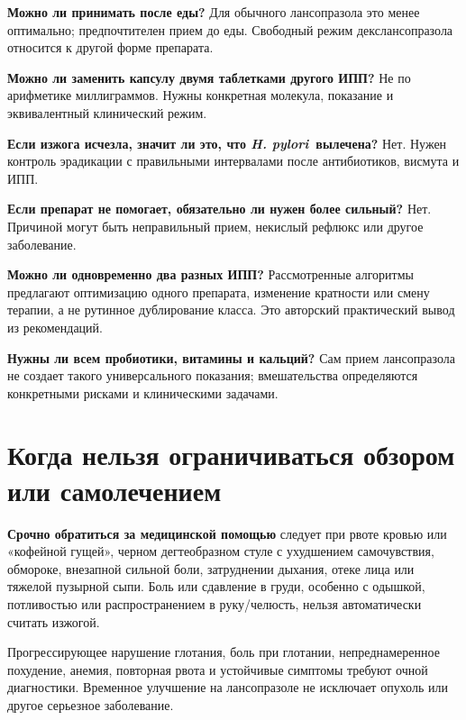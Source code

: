 \documentclass[11pt,a4paper,notitlepage]{report}
\newcommand{\Hp}{\textit{H. pylori}}
\newcommand{\src}[1]{\unskip\space\cite{#1}}
\begin{document}
\textbf{Можно ли принимать после еды?} Для обычного лансопразола это менее оптимально; предпочтителен прием до еды. Свободный режим декслансопразола относится к другой форме препарата.\src{acggerd,dexlabel}

\textbf{Можно ли заменить капсулу двумя таблетками другого ИПП?} Не по арифметике миллиграммов. Нужны конкретная молекула, показание и эквивалентный клинический режим.\src{nice}

\textbf{Если изжога исчезла, значит ли это, что \Hp\ вылечена?} Нет. Нужен контроль эрадикации с правильными интервалами после антибиотиков, висмута и ИПП.\src{acghighlights}

\textbf{Если препарат не помогает, обязательно ли нужен более сильный?} Нет. Причиной могут быть неправильный прием, некислый рефлюкс или другое заболевание.\src{agagerd,lyon}

\textbf{Можно ли одновременно два разных ИПП?} Рассмотренные алгоритмы предлагают оптимизацию одного препарата, изменение кратности или смену терапии, а не рутинное дублирование класса. Это авторский практический вывод из рекомендаций.\src{agagerd,dgvs}

\textbf{Нужны ли всем пробиотики, витамины и кальций?} Сам прием лансопразола не создает такого универсального показания; вмешательства определяются конкретными рисками и клиническими задачами.\src{acggerd,acghp}

\section{Когда нельзя ограничиваться обзором или самолечением}
\textbf{Срочно обратиться за медицинской помощью} следует при рвоте кровью или «кофейной гущей», черном дегтеобразном стуле с ухудшением самочувствия, обмороке, внезапной сильной боли, затруднении дыхания, отеке лица или тяжелой пузырной сыпи. Боль или сдавление в груди, особенно с одышкой, потливостью или распространением в руку/челюсть, нельзя автоматически считать изжогой.\src{otc,uslabel,esge2026}

Прогрессирующее нарушение глотания, боль при глотании, непреднамеренное похудение, анемия, повторная рвота и устойчивые симптомы требуют очной диагностики. Временное улучшение на лансопразоле не исключает опухоль или другое серьезное заболевание.\src{uslabel,dgvs}
\end{document}
